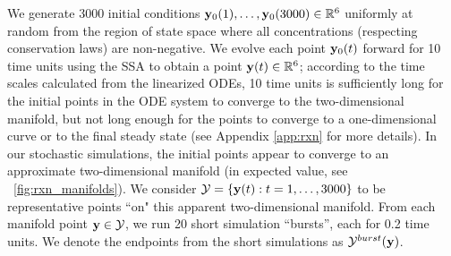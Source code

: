 We generate 3000 initial conditions $\mathbf{y}_0(1), \dots, \mathbf{y}_0(3000) \in \mathbb{R}^6$ uniformly at random from the
region of state space where all concentrations (respecting conservation laws) are non-negative.
%
We evolve each point $\mathbf{y}_0(t)$ forward for 10 time units using the SSA to obtain a point $\mathbf{y}(t) \in \mathbb{R}^6$;
according to the time scales calculated from the linearized ODEs, 10 time units is sufficiently long for the initial points in the ODE system to converge to the two-dimensional manifold,
but not long enough for the points to converge to a one-dimensional curve or to the final steady state (see Appendix \ref{app:rxn} for more details).
%
In our stochastic simulations, the initial points appear to converge to an approximate two-dimensional manifold
(in expected value, see \fig~\ref{fig:rxn_manifolds}).
%
We consider $\mathcal{Y} = \{ \mathbf{y}(t): t=1, \dots, 3000 \}$ to be representative points ``on" this apparent two-dimensional manifold.
%
From each manifold point $\mathbf{y} \in \mathcal{Y}$, we run 20 short simulation ``bursts'', each for 0.2 time units.
%
We denote the endpoints from the short simulations as $\mathcal{Y}^{burst}(\mathbf{y})$.

